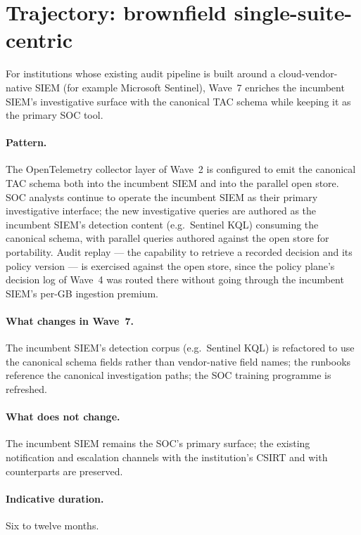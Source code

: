 \section{Trajectory: brownfield single-suite-centric}
\label{sec:w7-brownfield-ms}

For institutions whose existing audit pipeline is built around
a cloud-vendor-native SIEM (for example Microsoft Sentinel), Wave~7
enriches the incumbent SIEM's investigative surface with the
canonical TAC schema while keeping it as the primary SOC tool.

\paragraph{Pattern.} The OpenTelemetry collector layer of Wave~2
is configured to emit the canonical TAC schema both into
the incumbent SIEM and into the parallel open store. SOC analysts
continue to operate the incumbent SIEM as their primary
investigative interface; the new investigative queries are authored
as the incumbent SIEM's detection content (e.g.\ Sentinel KQL)
consuming the canonical schema, with parallel queries authored
against the open store for portability. Audit replay --- the
capability to retrieve a recorded decision and its policy version
--- is exercised against the open store, since the policy plane's
decision log of Wave~4 was routed there without going through the
incumbent SIEM's per-GB ingestion premium.

\paragraph{What changes in Wave~7.} The incumbent SIEM's detection
corpus (e.g.\ Sentinel KQL) is refactored to use the canonical
schema fields rather than vendor-native field names; the runbooks
reference the canonical investigation paths; the SOC training
programme is refreshed.

\paragraph{What does not change.} The incumbent SIEM remains the
SOC's primary surface; the existing notification and escalation
channels with the institution's CSIRT and with
 counterparts are preserved.

\paragraph{Indicative duration.} Six to twelve months.

